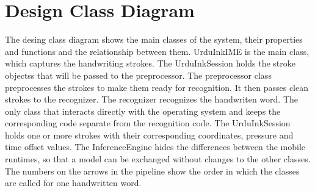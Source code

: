 \documentclass[12pt,a4paper]{report}
\begin{document}
\section{Design Class Diagram}
The desing class diagram shows the main classes of the system, their properties and functions and the relationship between them. UrduInkIME is the main class, which captures the handwriting strokes. The UrduInkSession holds the stroke objectss that will be passed to the preprocessor. The preprocessor class preprocesses the strokes to make them ready for recognition. It then passes clean strokes to the recognizer. The recognizer recognizes the handwriten word. The only class that interacts directly with the operating system and keeps the corresponding code separate from the recognition code. The UrduInkSession holds one or more strokes with their corresponding coordinates, pressure and time offset values. The InferenceEngine hides the differences between the mobile runtimes, so that a model can be exchanged without changes to the other classes. The numbers on the arrows in the pipeline show the order in which the classes are called for one handwritten word.
\end{document}

